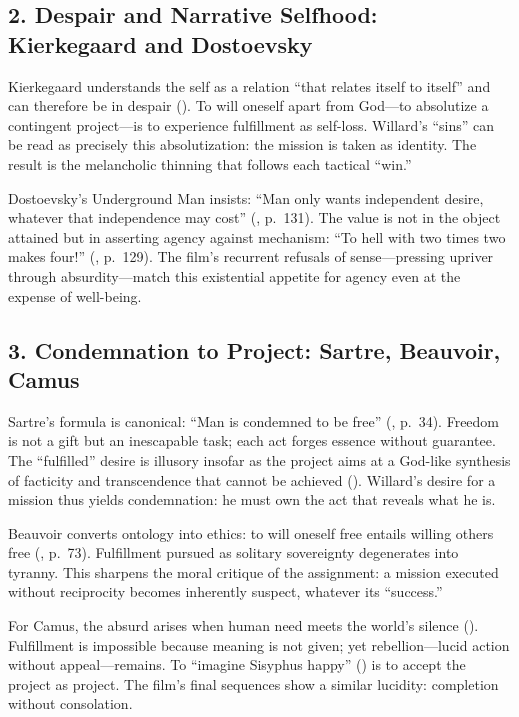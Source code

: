 \documentclass[12pt]{article}
\begin{document}
{\subsection*{2. Despair and Narrative Selfhood: Kierkegaard and Dostoevsky}

Kierkegaard understands the self as a relation ``that relates itself to itself'' and can therefore be in despair (\parencite[pp.~49--52]{KierkegaardSUD1980}). To will oneself apart from God---to absolutize a contingent project---is to experience fulfillment as self-loss. Willard’s ``sins'' can be read as precisely this absolutization: the mission is taken as identity. The result is the melancholic thinning that follows each tactical ``win.''

Dostoevsky’s Underground Man insists: ``Man only wants independent desire, whatever that independence may cost'' (\parencite{DostoevskyNFU1994}, p.~131). The value is not in the object attained but in asserting agency against mechanism: ``To hell with two times two makes four!'' (\parencite{DostoevskyNFU1994}, p.~129). The film’s recurrent refusals of sense---pressing upriver through absurdity---match this existential appetite for agency even at the expense of well-being.

\subsection*{3. Condemnation to Project: Sartre, Beauvoir, Camus}

Sartre’s formula is canonical: ``Man is condemned to be free'' (\parencite{SartreBN2003}, p.~34). Freedom is not a gift but an inescapable task; each act forges essence without guarantee. The ``fulfilled'' desire is illusory insofar as the project aims at a God-like synthesis of facticity and transcendence that cannot be achieved (\parencite[p.~604]{SartreBN2003}). Willard’s desire for a mission thus yields condemnation: he must own the act that reveals what he is.

Beauvoir converts ontology into ethics: to will oneself free entails willing others free (\parencite{Beauvoir1976}, p.~73). Fulfillment pursued as solitary sovereignty degenerates into tyranny. This sharpens the moral critique of the assignment: a mission executed without reciprocity becomes inherently suspect, whatever its ``success.''

For Camus, the absurd arises when human need meets the world’s silence (\parencite[p.~28]{CamusMyth1991}). Fulfillment is impossible because meaning is not given; yet rebellion---lucid action without appeal---remains. To ``imagine Sisyphus happy'' (\parencite[p.~123]{CamusMyth1991}) is to accept the project as project. The film’s final sequences show a similar lucidity: completion without consolation.

}
\end{document}
